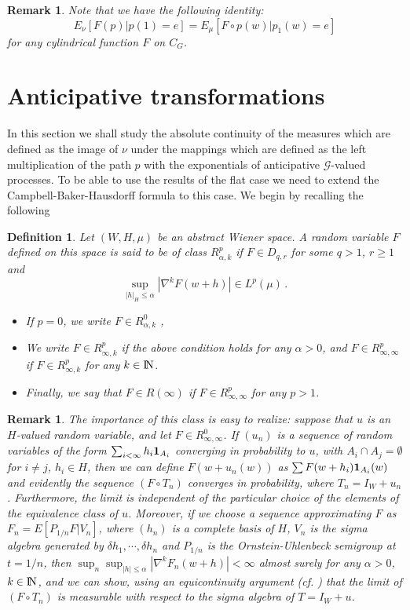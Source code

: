 \documentclass[12pt,a4paper]{book}
\newtheorem{definition}[theorem]{Definition}
\newtheorem{remarkk}[theorem]{Remark}
\newcommand{\G}{{\mathcal G}}
\newcommand{\N}{{\rm I\!N}}
\newcommand{\won}{{\mbox{\bf 1}}}
\begin{document}
\begin{remarkk}{\rm
Note that we have the following identity:
$$
E_\nu[F(p)|p(1)=e]=E_\mu[F\circ p(w)|p_1(w)=e]
$$
for any cylindrical function $F$ on $C_G$.}
\end{remarkk}


\section{Anticipative transformations}
In this section we shall study the absolute continuity of the measures which
are defined as the image of $\nu$ under the mappings which are defined as the
left multiplication of the path $p$ with the exponentials of anticipative
$\G$-valued processes. To be able to use the results of the flat case we need
to extend the Campbell-Baker-Hausdorff formula to this case. We begin
by recalling  the following
\begin{definition}
Let $(W,H,\mu)$ be an abstract Wiener space. A random variable $F$ defined on
this space is said to be of class $R^p_{\alpha,k}$ if $F\in D_{q,r}$ for some
$q>1$, $r\geq 1$ and
$$
\sup_{|h|_H\leq \alpha }|\nabla^k F(w+h)|\in L^p(\mu)\,.
$$
\begin{itemize}
\item If $p=0$, we write $F\in R^0_{\alpha,k}$ ,
\item We write $F\in R^p_{\infty,k}$ if the above condition holds for any
  $\alpha >0$, and $F\in R^p_{\infty,\infty}$ if $F\in R^p_{\infty,k}$ for any
  $k\in \N$.
\item Finally, we say that $F\in R(\infty)$ if $F\in R_{\infty,\infty}^p$ for
  any $p>1$.
\end{itemize}
\end{definition}
\begin{remarkk}{\rm
The importance of this class is easy to realize: suppose that $u$ is an
$H$-valued random variable, and let $F\in R_{\infty,\infty}^0$. If $(u_n)$ is a
sequence of random variables of the form $\sum_{i<\infty} h_i\won_{A_i}$
converging in probability to $u$, with $A_i\cap A_j=\emptyset$ for $i\neq j$,
$h_i\in H$, then we can define $F(w+u_n(w))$ as $\sum
F(w+h_i)\won_{A_i}(w)$ and
evidently the sequence $(F\circ T_n)$ converges in probability, where
$T_n=I_W+u_n$. Furthermore, the limit is independent of the particular choice
of the elements of the equivalence class of $u$. Moreover, if  we  choose a
sequence approximating $F$ as $F_n=E[P_{1/n}F|V_n]$, where $(h_n)$ is a
complete basis of $H$, $V_n$ is the sigma algebra generated by $\delta
h_1,\cdots,\delta h_n$ and $P_{1/n}$ is the Ornstein-Uhlenbeck semigroup at
$t=1/n$, then $\sup_n\sup_{|h|\leq \alpha}|\nabla^k F_n(w+h)|<\infty $ almost
surely  for any
$\alpha>0$, $k\in \N$, and  we can show, using an equicontinuity argument
(cf. \cite{UZ7}) that the limit of $(F\circ T_n)$  is measurable with
respect to the sigma algebra of $T=I_W+u$. }
\end{remarkk}
\end{document}

